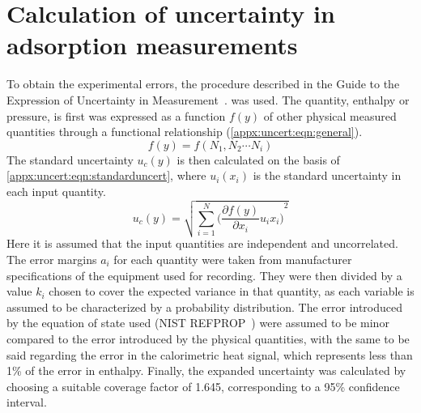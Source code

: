 
\graphicspath{ {\thisappx/figures/} }

\chapter{Calculation of uncertainty in adsorption measurements}%
\label{appx:errors}

To obtain the experimental errors, the procedure described in 
the Guide to the Expression of Uncertainty in 
Measurement~\cite{EvaluationMeasurementData2008}.
was used. The quantity, enthalpy or pressure, is first was expressed
as a function \(f(y)\) of other physical measured quantities through a
functional relationship (\autoref{appx:uncert:eqn:general}).
%
\begin{equation}\label{appx:uncert:eqn:general}
    f(y)=f(N_1,N_2 \cdots N_i)
\end{equation}
%
The standard uncertainty \(u_c (y)\)
is then calculated on the basis of \autoref{appx:uncert:eqn:standarduncert},
where \(u_i (x_i)\) is the standard uncertainty in each input quantity.
%
\begin{equation}\label{appx:uncert:eqn:standarduncert}
    u_c(y) = \sqrt{ \sum_{i=1}^N {\Big( \frac{\partial f(y)}{\partial x_i} u_i x_i  \Big)}^2 }
\end{equation}
%
Here it is assumed 
that the input quantities are independent and uncorrelated. 
The error margins \(a_i\) for each quantity were taken from manufacturer 
specifications of the equipment used for recording. They were then divided
by a value \(k_i\) chosen to cover the expected variance in that quantity,
as each variable is assumed to be characterized by a probability 
distribution. The error introduced by the equation of state used 
(\gls{NIST} REFPROP~\cite{lemmonNISTReferenceFluid1989}) were assumed to
be minor compared to the error 
introduced by the physical quantities, with the same to be 
said regarding the error in the calorimetric heat signal, which 
represents less than 1\% of the error in enthalpy. Finally, the expanded 
uncertainty was calculated by choosing a suitable coverage factor of
1.645, corresponding to a 95\% confidence interval.



